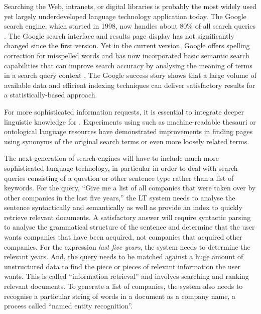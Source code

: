 \begin{multicols}{2}
Searching the Web, intranets, or digital libraries is probably the most widely used yet largely underdeveloped language technology application today.
The Google search engine, which started in 1998, now handles about 80\% of all search queries \cite{Meta16}.
The Google search interface and results page display has not significantly changed since the first version.
Yet in the current version, Google offers spelling correction for misspelled words and has now incorporated basic semantic search capabilities that can improve search accuracy by analysing the meaning of terms in a search query context \cite{Meta17}.
The Google success story shows that a large volume of available data and efficient indexing techniques can deliver satisfactory results for a statistically-based approach.

For more sophisticated information requests, it is essential to integrate deeper linguistic knowledge for .
Experiments using  such as machine-readable thesauri or ontological language resources have demonstrated improvements in finding pages using synonyms of the original search terms or even more loosely related terms.

The next generation of search engines will have to include much more sophisticated language technology, in particular in order to deal with search queries consisting of a question or other sentence type rather than a list of keywords.
For the query, ``Give me a list of all companies that were taken over by other companies in the last five years,'' the LT system needs to analyse the sentence syntactically and semantically as well as provide an index to quickly retrieve relevant documents.
A satisfactory answer will require syntactic parsing to analyse the grammatical structure of the sentence and determine that the user wants companies that have been acquired, not companies that acquired other companies.
For the expression \textit{last five years}, the system needs to determine the relevant years.
And, the query needs to be matched against a huge amount of unstructured data to find the piece or pieces of relevant information the user wants.
This is called ``information retrieval'' and involves searching and ranking relevant documents.
To generate a list of companies, the system also needs to recognise a particular string of words in a document as a company name, a process called ``named entity recognition''.


\end{multicols}
